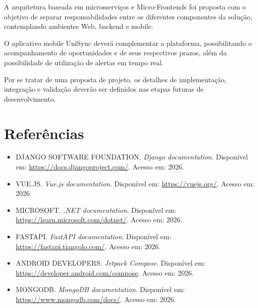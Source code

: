 \documentclass[12pt,oneside,a4paper,chapter=TITLE]{abntex2}
\begin{document}
A arquitetura baseada em microsserviços e Micro-Frontends foi proposta
com o objetivo de separar responsabilidades entre os diferentes
componentes da solução, contemplando ambientes Web, backend e mobile.

O aplicativo mobile UniSync deverá complementar a plataforma,
possibilitando o acompanhamento de oportunidades e de seus respectivos
prazos, além da possibilidade de utilização de alertas em tempo real.

Por se tratar de uma proposta de projeto, os detalhes de implementação,
integração e validação deverão ser definidos nas etapas futuras de
desenvolvimento.

\chapter{Referências}

\begin{itemize}
    \item DJANGO SOFTWARE FOUNDATION. \textit{Django documentation}.
    Disponível em: \url{https://docs.djangoproject.com/}. Acesso em:
    2026.

    \item VUE.JS. \textit{Vue.js documentation}. Disponível em:
    \url{https://vuejs.org/}. Acesso em: 2026.

    \item MICROSOFT. \textit{.NET documentation}. Disponível em:
    \url{https://learn.microsoft.com/dotnet/}. Acesso em: 2026.

    \item FASTAPI. \textit{FastAPI documentation}. Disponível em:
    \url{https://fastapi.tiangolo.com/}. Acesso em: 2026.

    \item ANDROID DEVELOPERS. \textit{Jetpack Compose}. Disponível em:
    \url{https://developer.android.com/compose}. Acesso em: 2026.

    \item MONGODB. \textit{MongoDB documentation}. Disponível em:
    \url{https://www.mongodb.com/docs/}. Acesso em: 2026.
\end{itemize}
\end{document}
